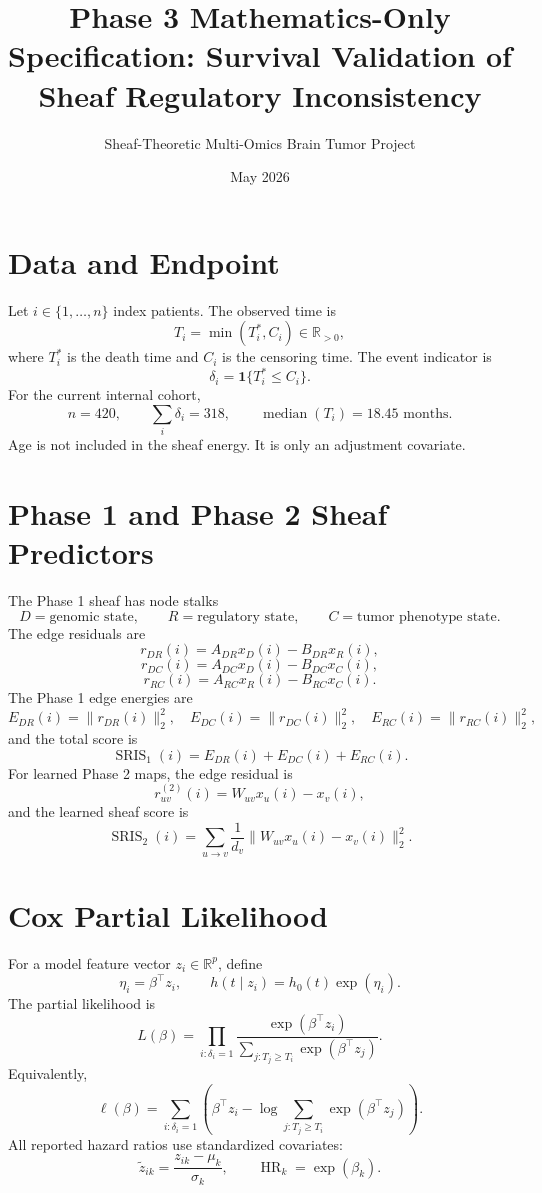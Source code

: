 \documentclass[11pt]{article}
\title{Phase 3 Mathematics-Only Specification: Survival Validation of Sheaf Regulatory Inconsistency}
\author{Sheaf-Theoretic Multi-Omics Brain Tumor Project}
\date{May 2026}
\begin{document}
\maketitle

\section*{Data and Endpoint}
Let $i\in\{1,\ldots,n\}$ index patients. The observed time is
\[
T_i=\min(T_i^\ast,C_i)\in \mathbb{R}_{>0},
\]
where $T_i^\ast$ is the death time and $C_i$ is the censoring time. The event indicator is
\[
\delta_i=\mathbf{1}\{T_i^\ast\le C_i\}.
\]
For the current internal cohort,
\[
 n=420,\qquad \sum_i\delta_i=318,\qquad \operatorname{median}(T_i)=18.45\text{ months}.
\]
Age is not included in the sheaf energy. It is only an adjustment covariate.

\section{Phase 1 and Phase 2 Sheaf Predictors}
The Phase 1 sheaf has node stalks
\[
D=\text{genomic state},\qquad R=\text{regulatory state},\qquad C=\text{tumor phenotype state}.
\]
The edge residuals are
\[
r_{DR}(i)=A_{DR}x_D(i)-B_{DR}x_R(i),
\]
\[
r_{DC}(i)=A_{DC}x_D(i)-B_{DC}x_C(i),
\]
\[
r_{RC}(i)=A_{RC}x_R(i)-B_{RC}x_C(i).
\]
The Phase 1 edge energies are
\[
E_{DR}(i)=\|r_{DR}(i)\|_2^2,\quad
E_{DC}(i)=\|r_{DC}(i)\|_2^2,\quad
E_{RC}(i)=\|r_{RC}(i)\|_2^2,
\]
and the total score is
\[
\operatorname{SRIS}_1(i)=E_{DR}(i)+E_{DC}(i)+E_{RC}(i).
\]
For learned Phase 2 maps, the edge residual is
\[
r_{uv}^{(2)}(i)=W_{uv}x_u(i)-x_v(i),
\]
and the learned sheaf score is
\[
\operatorname{SRIS}_2(i)=\sum_{u\to v}\frac{1}{d_v}\|W_{uv}x_u(i)-x_v(i)\|_2^2.
\]

\section{Cox Partial Likelihood}
For a model feature vector $z_i\in\mathbb{R}^p$, define
\[
\eta_i=\beta^\top z_i,
\qquad
h(t\mid z_i)=h_0(t)\exp(\eta_i).
\]
The partial likelihood is
\[
L(\beta)=\prod_{i:\delta_i=1}\frac{\exp(\beta^\top z_i)}{\sum_{j:T_j\ge T_i}\exp(\beta^\top z_j)}.
\]
Equivalently,
\[
\ell(\beta)=\sum_{i:\delta_i=1}\left(\beta^\top z_i-\log\sum_{j:T_j\ge T_i}\exp(\beta^\top z_j)\right).
\]
All reported hazard ratios use standardized covariates:
\[
\widetilde z_{ik}=\frac{z_{ik}-\mu_k}{\sigma_k},
\qquad
\operatorname{HR}_k=\exp(\beta_k).
\]
\end{document}
